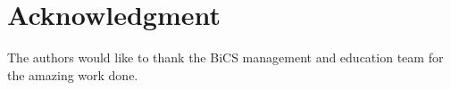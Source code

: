 \section*{Acknowledgment}
The authors would like to thank the BiCS management and education team for the amazing work done.
